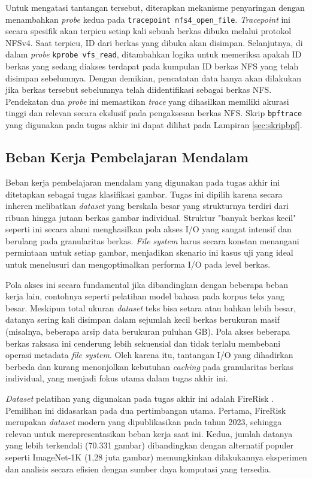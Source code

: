 Untuk mengatasi tantangan tersebut, diterapkan mekanisme penyaringan dengan menambahkan \textit{probe} kedua pada \texttt{tracepoint nfs4\_open\_file}. \textit{Tracepoint} ini secara spesifik akan terpicu setiap kali sebuah berkas dibuka melalui protokol NFSv4. Saat terpicu, ID dari berkas yang dibuka akan disimpan. Selanjutnya, di dalam \textit{probe} \texttt{kprobe vfs\_read}, ditambahkan logika untuk memeriksa apakah ID berkas yang sedang diakses terdapat pada kumpulan ID berkas NFS yang telah disimpan sebelumnya. Dengan demikian, pencatatan data hanya akan dilakukan jika berkas tersebut sebelumnya telah diidentifikasi sebagai berkas NFS. Pendekatan dua \textit{probe} ini memastikan \textit{trace} yang dihasilkan memiliki akurasi tinggi dan relevan secara ekslusif pada pengaksesan berkas NFS. Skrip \texttt{bpftrace} yang digunakan pada tugas akhir ini dapat dilihat pada Lampiran \ref{sec:skripbpf}.

\subsection{Beban Kerja Pembelajaran Mendalam}
Beban kerja pembelajaran mendalam yang digunakan pada tugas akhir ini ditetapkan sebagai tugas klasifikasi gambar. Tugas ini dipilih karena secara inheren melibatkan \textit{dataset} yang berskala besar yang strukturnya terdiri dari ribuan hingga jutaan berkas gambar individual. Struktur "banyak berkas kecil" seperti ini secara alami menghasilkan pola akses I/O yang sangat intensif dan berulang pada granularitas berkas. \textit{File system} harus secara konstan menangani permintaan untuk setiap gambar, menjadikan skenario ini kasus uji yang ideal untuk menelusuri dan mengoptimalkan performa I/O pada level berkas.

Pola akses ini secara fundamental jika dibandingkan dengan beberapa beban kerja lain, contohnya seperti pelatihan model bahasa pada korpus teks yang besar. Meskipun total ukuran \textit{dataset} teks bisa setara atau bahkan lebih besar, datanya sering kali disimpan dalam sejumlah kecil berkas berukuran masif (misalnya, beberapa arsip data berukuran puluhan GB). Pola akses beberapa berkas raksasa ini cenderung lebih sekuensial dan tidak terlalu membebani operasi metadata \textit{file system}. Oleh karena itu, tantangan I/O yang dihadirkan berbeda dan kurang menonjolkan kebutuhan \textit{caching} pada granularitas berkas individual, yang menjadi fokus utama dalam tugas akhir ini.

\textit{Dataset} pelatihan yang digunakan pada tugas akhir ini adalah FireRisk \parencite{FireRisk}. Pemilihan ini didasarkan pada dua pertimbangan utama. Pertama, FireRisk merupakan \textit{dataset} modern yang dipublikasikan pada tahun 2023, sehingga relevan untuk merepresentasikan beban kerja saat ini. Kedua, jumlah datanya yang lebih terkendali (70.331 gambar) dibandingkan dengan alternatif populer seperti ImageNet-1K (1,28 juta gambar) memungkinkan dilakukannya eksperimen dan analisis secara efisien dengan sumber daya komputasi yang tersedia.

